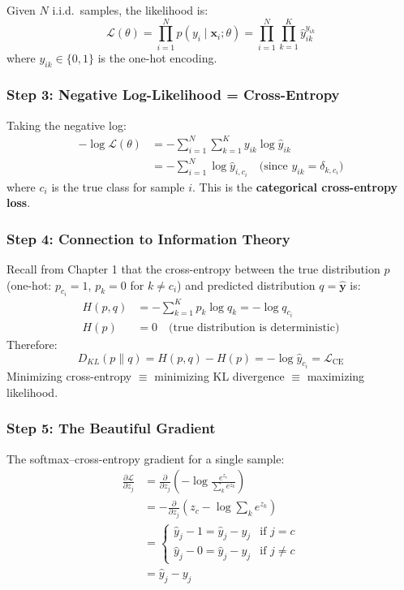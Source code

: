 Given $N$ i.i.d.\ samples, the likelihood is:
\begin{equation}
\mathcal{L}(\theta) = \prod_{i=1}^{N} p(y_i \mid \mathbf{x}_i; \theta) = \prod_{i=1}^{N} \prod_{k=1}^{K} \hat{y}_{ik}^{y_{ik}}
\end{equation}
where $y_{ik} \in \{0, 1\}$ is the one-hot encoding.

\subsubsection{Step 3: Negative Log-Likelihood = Cross-Entropy}

Taking the negative log:
\begin{align}
-\log \mathcal{L}(\theta) &= -\sum_{i=1}^{N} \sum_{k=1}^{K} y_{ik} \log \hat{y}_{ik} \\
&= -\sum_{i=1}^{N} \log \hat{y}_{i, c_i} \quad \text{(since } y_{ik} = \delta_{k, c_i}\text{)}
\end{align}
where $c_i$ is the true class for sample $i$. This is the \textbf{categorical cross-entropy loss}.

\subsubsection{Step 4: Connection to Information Theory}

Recall from Chapter 1 that the cross-entropy between the true distribution $p$ (one-hot: $p_{c_i} = 1$, $p_k = 0$ for $k \neq c_i$) and predicted distribution $q = \hat{\mathbf{y}}$ is:
\begin{align}
H(p, q) &= -\sum_{k=1}^{K} p_k \log q_k = -\log q_{c_i} \\
H(p) &= 0 \quad \text{(true distribution is deterministic)}
\end{align}
Therefore:
\begin{equation}
D_{KL}(p \| q) = H(p, q) - H(p) = -\log \hat{y}_{c_i} = \mathcal{L}_{\text{CE}}
\end{equation}
Minimizing cross-entropy $\equiv$ minimizing KL divergence $\equiv$ maximizing likelihood.

\subsubsection{Step 5: The Beautiful Gradient}

The softmax--cross-entropy gradient for a single sample:
\begin{align}
\frac{\partial \mathcal{L}}{\partial z_j} &= \frac{\partial}{\partial z_j}\left(-\log \frac{e^{z_{c}}}{\sum_k e^{z_k}}\right) \\
&= -\frac{\partial}{\partial z_j}\left(z_c - \log \sum_k e^{z_k}\right) \\
&= \begin{cases}
\hat{y}_j - 1 = \hat{y}_j - y_j & \text{if } j = c \\
\hat{y}_j - 0 = \hat{y}_j - y_j & \text{if } j \neq c
\end{cases} \\
&= \boxed{\hat{y}_j - y_j}
\end{align}

